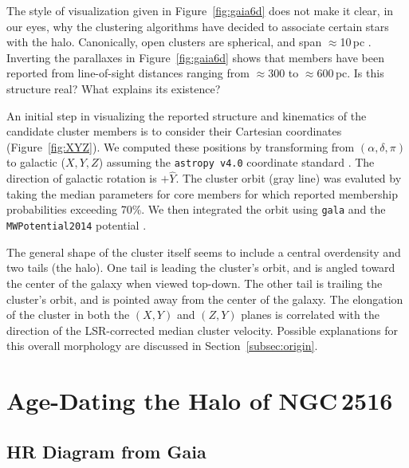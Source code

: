 \documentclass[12pt,twocolumn,tighten]{aastex63}
\begin{document}
The style of visualization given in Figure~\ref{fig:gaia6d} does not
make it clear, in our eyes, why the clustering algorithms have decided
to associate certain stars with the halo.  Canonically, open clusters
are spherical, and span $\approx$10\,pc \citep[{\it
e.g.},][]{Kharchenko_et_al_2013}.  Inverting the parallaxes in
Figure~\ref{fig:gaia6d} shows that members have been reported from
line-of-sight distances ranging from $\approx$$300$ to
$\approx$$600\,$pc.  Is this structure real? What explains its
existence?

An initial step in visualizing the reported structure and kinematics
of the candidate cluster members is to consider their Cartesian
coordinates (Figure~\ref{fig:XYZ}).  We computed these positions by
transforming from $(\alpha, \delta, \pi)$ to galactic ($X,Y,Z$)
assuming the \texttt{astropy v4.0} coordinate standard
\citep{astropy_2018}.  The direction of galactic rotation is
$+\hat{Y}$. The cluster orbit (gray line) was evaluted by taking the
median parameters for core members for which
 reported membership probabilities
exceeding 70\%.  We then integrated the orbit using \texttt{gala} and
the \texttt{MWPotential2014} potential \citep{bovy_galpy_2015,gala}.

The general shape of the cluster itself seems to include a central
overdensity and two tails (the halo).  One tail is leading the
cluster's orbit, and is angled toward the center of the galaxy when
viewed top-down.  The other tail is trailing the cluster's orbit, and
is pointed away from the center of the galaxy.  The elongation of the
cluster in both the $(X,Y)$ and $(Z,Y)$ planes is correlated with the
direction of the LSR-corrected median cluster velocity.   Possible
explanations for this overall morphology are discussed in
Section~\ref{subsec:origin}.



\section{Age-Dating the Halo of NGC\,2516}
\label{sec:agedate}

\subsection{HR Diagram from Gaia}
\label{subsec:hr}
\end{document}
